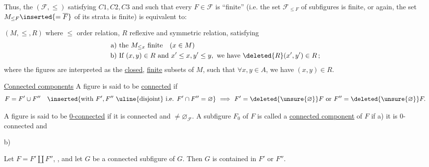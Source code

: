  Thus, the  $(\mathcal F,\leq)$ satisfying $C1,C2,C3$ and such that every $F\in\mathcal F$ is ``finite'' (i.e. the set $\mathcal F_{\leq F}$ of subfigures is finite, or again, the set $M_{\leq F}\inserted{=\overline F}$  of  its strata is finite) is equivalent to:

$(M,\leq,R)$  where $\leq$ order relation, $R$ reflexive and symmetric relation, satisfying
\[
\begin{aligned}
\text{a) }&\text{the }M_{\leq x}\text{ finite}\quad(x\in M)\\
\text{b) }&\text{If }(x,y)\in R\text{ and }x'\leq x,y'\leq y,\ \text{we have }\deleted{R}(x',y')\in R\,;
\end{aligned}
\]
where the figures are interpreted as the \uline{closed}, \uline{finite} subsets  of $M$, such that $\forall x,y\in A$, we have $(x,y)\in R$.


\uline{Connected components} A figure is said to be \uline{connected} if 
\[
F=F'\cup F''\quad
\inserted{\text{with }F',F''\ \text{\uline{disjoint} i.e. }F'\cap F''=\varnothing}
\ \Longrightarrow\ F'=\deleted{\unsure{\varnothing}}F\ \text{or }F''=\deleted{\unsure{\varnothing}}F.
\]


A figure is said to be \uline{0-connected} if it is connected and $\ne\varnothing_{\mathcal F}$. A subfigure $F_0$ of $F$ is called a \uline{connected component} of $F$ if a) it is 0-connected and

b)   

  Let $F=F'\amalg F''$, , and let $G$ be a connected subfigure of $G$. Then $G$ is contained in $F'$ or $F''$.
